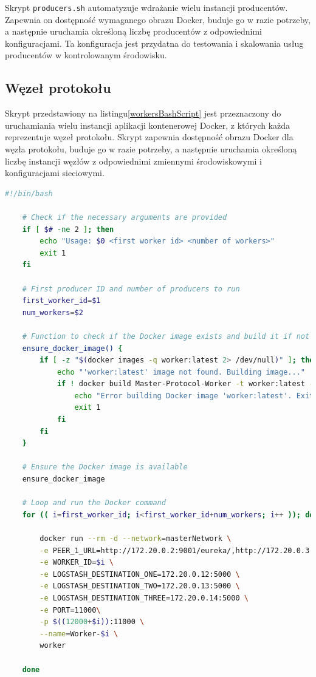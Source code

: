 Skrypt \verb|producers.sh| automatyzuje wdrażanie wielu instancji producentów. Zapewnia on dostępność wymaganego obrazu Docker, buduje go w razie potrzeby, a następnie uruchamia określoną liczbę producentów z odpowiednimi konfiguracjami. Ta konfiguracja jest przydatna do testowania i skalowania usług producentów w kontrolowanym środowisku.

\subsection{Węzeł protokołu}

Skrypt przedstawiony na listingu\ref{workersBashScript} jest przeznaczony do uruchamiania wielu instancji aplikacji kontenerowej Docker, z których każda reprezentuje węzeł protokołu. Skrypt zapewnia dostępność obrazu Docker dla węzła protokołu, buduje go w razie potrzeby, a następnie uruchamia określoną liczbę instancji węzłów z odpowiednimi zmiennymi środowiskowymi i konfiguracjami sieciowymi.

\begin{lstlisting}[language=bash,caption=Kod skryptu workers.sh,label=workersBashScript]
    #!/bin/bash

    # Check if the necessary arguments are provided
    if [ $# -ne 2 ]; then
        echo "Usage: $0 <first worker id> <number of workers>"
        exit 1
    fi
    
    # First producer ID and number of producers to run
    first_worker_id=$1
    num_workers=$2
    
    # Function to check if the Docker image exists and build it if not
    ensure_docker_image() {
        if [ -z "$(docker images -q worker:latest 2> /dev/null)" ]; then
            echo "'worker:latest' image not found. Building image..."
            if ! docker build Master-Protocol-Worker -t worker:latest --no-cache; then
                echo "Error building Docker image 'worker:latest'. Exiting."
                exit 1
            fi
        fi
    }
    
    # Ensure the Docker image is available
    ensure_docker_image
    
    # Loop and run the Docker command
    for (( i=first_worker_id; i<first_worker_id+num_workers; i++ )); do
    
        docker run --rm -d --network=masterNetwork \
        -e PEER_1_URL=http://172.20.0.2:9001/eureka/,http://172.20.0.3:9002/eureka/,http://172.20.0.4:9003/eureka/ \
        -e WORKER_ID=$i \
        -e LOGSTASH_DESTINATION_ONE=172.20.0.12:5000 \
        -e LOGSTASH_DESTINATION_TWO=172.20.0.13:5000 \
        -e LOGSTASH_DESTINATION_THREE=172.20.0.14:5000 \
        -e PORT=11000\
        -p $((12000+$i)):11000 \
        --name=Worker-$i \
        worker
    
    done
\end{lstlisting}

